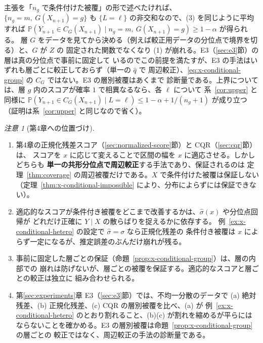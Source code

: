 \documentclass[a4paper,11pt]{jsarticle}
\theoremstyle{definition}
\theoremstyle{plain}
\theoremstyle{remark}
\newtheorem{remark}[definition]{注意}
\newcommand{\Prob}{\mathbb{P}}
\newcommand{\qhat}{\hat{q}}
\begin{document}
主張を「$n_g$ で条件付けた被覆」の形で述べたければ、$\{n_g=m,\ G(X_{n+1})=g\}$ も
$\{L=\ell\}$ の非交和なので、(3) を同じように平均すれば
$\Prob(Y_{n+1}\in C_G(X_{n+1})\mid n_g=m,\ G(X_{n+1})=g)\ge1-\alpha$ が得られる。
層 $G$ をデータを見てから決める（例えば較正用データの分位点で境界を切る）と、$G$ が $Z$ の
固定された関数でなくなり (1) が崩れる。E3（\ref{sec:e3}節）の層は真の分位点で事前に固定して
いるのでこの前提を満たすが、E3 の手法はいずれも層ごとに較正しておらず（単一の $\qhat$ で
周辺較正）、\eqref{eq:x-conditional-group} の $C_G$ ではない。E3 の層別被覆はあくまで
診断量である。上界については、層 $g$ 内のスコアが確率 $1$ で相異なるなら、各 $\ell$ について
系~\ref{cor:upper} と同様に
$\Prob(Y_{n+1}\in C_G(X_{n+1})\mid L=\ell)\le1-\alpha+1/(n_g+1)$ が成り立つ
（証明は系~\ref{cor:upper} と同じなので省く）。

\begin{remark}[第4章への位置づけ]
  \label{rem:x-conditional-ch4}
  \leavevmode
  \begin{enumerate}
    \item 第4章の正規化残差スコア（\ref{sec:normalized-score}節）と CQR（\ref{sec:cqr}節）は、
      スコアを $x$ に応じて変えることで区間の幅を $x$ に適応させる。しかしどちらも
      \textbf{単一の共形分位点で周辺較正}する手法であり、保証されるのは
      定理~\ref{thm:coverage} の周辺被覆だけである。$X$ で条件付けた被覆は保証しない
      （定理~\ref{thm:x-conditional-impossible} により、分布によらずには保証できない）。
    \item 適応的なスコアが条件付き被覆をどこまで改善するかは、$\hat\sigma(x)$ や分位点回帰が
      どれだけ正確に $Y\mid X$ の散らばりを捉えるかに依存する。
      例~\ref{ex:x-conditional-hetero} の設定で $\hat\sigma=\sigma$ なら正規化残差の
      条件付き被覆は $x$ によらず一定になるが、推定誤差のぶんだけ崩れが残る。
    \item 事前に固定した層ごとの保証（命題~\ref{prop:x-conditional-group}）は、層の内部での
      崩れは防げないが、層ごとの被覆を保証する。適応的なスコアと層ごとの較正は独立に
      組み合わせられる。
    \item 第\ref{sec:experiments}章 E3（\ref{sec:e3}節）では、不均一分散のデータで
      (a) 絶対残差、(b) 正規化残差、(c) CQR の層別被覆を比べ、(a) が
      例~\ref{ex:x-conditional-hetero} のとおり割れること、(b)(c) が割れを縮めるが平らには
      ならないことを確かめる。E3 の層別被覆は命題~\ref{prop:x-conditional-group} の層ごとの
      較正ではなく、周辺較正の手法の診断量である。
  \end{enumerate}
\end{remark}
\end{document}
